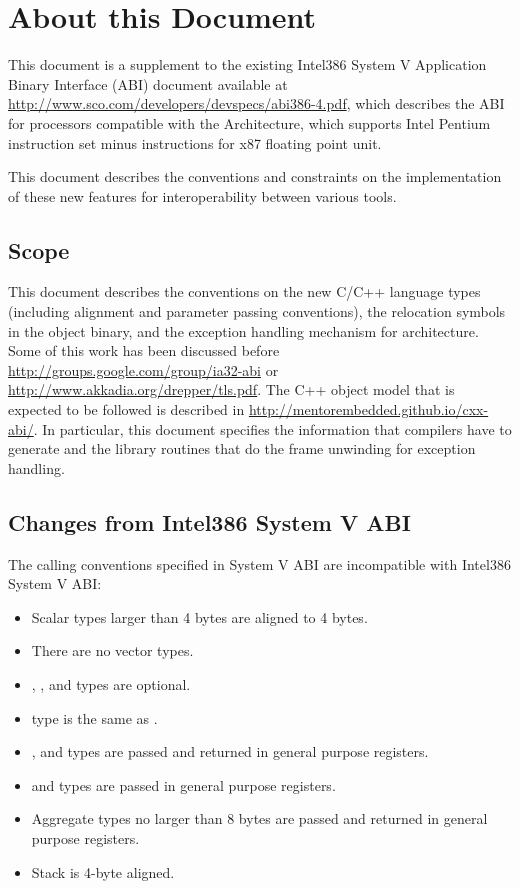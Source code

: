 \chapter{About this Document\label{intro}}

This document is a supplement to the existing Intel386 System V
Application Binary Interface (ABI) document available at
\url{http://www.sco.com/developers/devspecs/abi386-4.pdf},
which describes the ABI for processors compatible with the
\xARCH Architecture, which supports Intel Pentium instruction set
minus instructions for x87 floating point unit.

This document describes the conventions and constraints on the
implementation of these new features for interoperability between
various tools.

\section{Scope}

This document describes the conventions on the new C/C++ language types
(including alignment and parameter passing conventions), the relocation
symbols in the object binary, and the exception handling mechanism for
\xARCH architecture.  Some of this work has been discussed before
\url{http://groups.google.com/group/ia32-abi} or
\url{http://www.akkadia.org/drepper/tls.pdf}. The C++ object model that
is expected to be followed is described in
\url{http://mentorembedded.github.io/cxx-abi/}.  In particular,
this document specifies the information that compilers have to generate
and the library routines that do the frame unwinding for exception
handling.

\section{Changes from Intel386 System V ABI}

The calling conventions specified in \xARCH System V ABI are
incompatible with Intel386 System V ABI:

\begin{itemize}
  \item Scalar types larger than 4 bytes are aligned to 4 bytes.
  \item There are no vector types.
  \item {}, , and 
	types are optional.
  \item {} type is the same as .
  \item {},  and  types are
	passed and returned in general purpose registers.
  \item {} and  types are passed
	in general purpose registers.
  \item Aggregate types no larger than 8 bytes are passed and returned
	in general purpose registers.
  \item Stack is 4-byte aligned.
\end{itemize}


